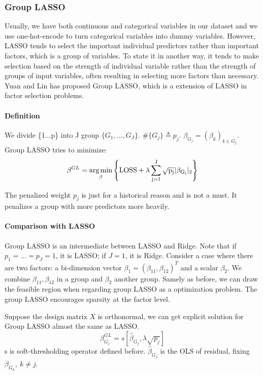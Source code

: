 \documentclass[]{article}
\begin{document}
\subsubsection{Group LASSO}
Usually, we have both continuous and categorical variables in our dataset and we use one-hot-encode to turn categorical variables into dummy variables. However, LASSO tends to select the important individual predictors rather than important factors, which is a group of variables. To state it in another way, it tends to make selection based on the strength of individual variable rather than the strength of groups of input variables, often resulting in selecting more factors than necessary. Yuan and Lin has proposed Group LASSO, which is a extension of LASSO in factor selection problems.
\paragraph{Definition}
We divide \{1...p\} into J group $ \{G_1,...,G_J\} $. $ \#\{G_j\}\triangleq p_j $. $ \beta_{G_j}=(\beta_k)_{k\in G_j} $.
Group LASSO tries to minimize:
\begin{equation} 
\beta^{GL} =\mathop{\arg\min}_{\beta} \left\{\rm LOSS+\lambda \sum_{j=1}^J \sqrt{p_j}|\beta_{G_j}|_2\right\}
\end{equation}

The penalized weight $ p_j $ is just for a historical reason and is not a must. It penalizes a group with more predictors more heavily.
\paragraph{Comparison with LASSO}
Group LASSO is an intermediate between LASSO and Ridge. Note that if $ p_1=...=p_J=1 $, it is LASSO; if $ J=1 $, it is Ridge. Consider a case where there are two factors: a bi-dimension vector $ \beta_1=(\beta_{11},\beta_{12})^T $ and a scalar $ \beta_2 $. We combine $ \beta_{11},\beta_{12} $ in a group and $ \beta_2 $ another group. Samely as before, we can draw the feasible region when regarding group LASSO as a optimization problem. The group LASSO encourages sparsity at the factor level.

Suppose the design matrix $ X $ is orthonormal, we can get explicit solution for Group LASSO almost the same as LASSO.
\begin{equation} 
\beta_{G_j}^{GL}=s[\hat{\beta}_{G_j},\lambda\sqrt{p_j}]
\end{equation}
s is soft-thresholding operator defined before. $ \hat{\beta}_{G_j} $ is the OLS of residual, fixing $\beta_{G_k},\ k\neq j$.
\end{document}
